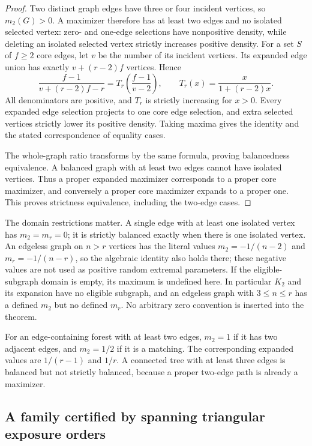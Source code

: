 \begin{proof}
Two distinct graph edges have three or four incident vertices, so $m_2(G)>0$.
A maximizer therefore has at least two edges and no isolated selected vertex:
zero- and one-edge selections have nonpositive density, while deleting an
isolated selected vertex strictly increases positive density.
For a set $S$ of $f\ge2$ core edges, let $v$ be the number of its incident
vertices. Its expanded edge union has exactly $v+(r-2)f$ vertices. Hence
\[
 \frac{f-1}{v+(r-2)f-r}
   =T_r\left(\frac{f-1}{v-2}\right),\qquad
 T_r(x)=\frac{x}{1+(r-2)x}.
\]
All denominators are positive, and $T_r$ is strictly increasing for $x>0$.
Every expanded edge selection projects to one core edge selection, and extra
selected vertices strictly lower its positive density. Taking maxima gives
the identity and the stated correspondence of equality cases.

The whole-graph ratio transforms by the same formula, proving balancedness
equivalence. A balanced graph with at least two edges cannot have isolated
vertices. Thus a proper expanded maximizer corresponds to a proper core
maximizer, and conversely a proper core maximizer expands to a proper one.
This proves strictness equivalence, including the two-edge cases.
\end{proof}

The domain restrictions matter. A single edge with at least one isolated
vertex has $m_2=m_r=0$; it is strictly balanced exactly when there is one
isolated vertex. An edgeless graph on $n>r$ vertices has the literal values
$m_2=-1/(n-2)$ and $m_r=-1/(n-r)$, so the algebraic identity also holds there;
these negative values are not used as positive random extremal parameters.
If the eligible-subgraph domain is empty, its maximum is undefined here.
In particular $K_2$ and its expansion have no eligible subgraph, and an
edgeless graph with $3\le n\le r$ has a defined $m_2$ but no defined $m_r$.
No arbitrary zero convention is inserted into the theorem.

For an edge-containing forest with at least two edges, $m_2=1$ if it has
two adjacent edges, and $m_2=1/2$ if it is a matching. The corresponding
expanded values are $1/(r-1)$ and $1/r$. A connected tree with at least
three edges is balanced but not strictly balanced, because a proper
two-edge path is already a maximizer.

\subsection{A family certified by spanning triangular exposure orders}

